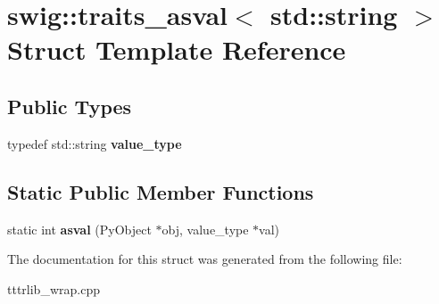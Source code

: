 \hypertarget{structswig_1_1traits__asval_3_01std_1_1string_01_4}{}\section{swig\+:\+:traits\+\_\+asval$<$ std\+:\+:string $>$ Struct Template Reference}
\label{structswig_1_1traits__asval_3_01std_1_1string_01_4}
\subsection*{Public Types}
\begin{DoxyCompactItemize}
\item 
\mbox{\label{structswig_1_1traits__asval_3_01std_1_1string_01_4_a66eab9ad087e2527eb509f04e6e70d75}} 
typedef std\+::string {\bfseries value\+\_\+type}
\end{DoxyCompactItemize}
\subsection*{Static Public Member Functions}
\begin{DoxyCompactItemize}
\item 
\mbox{\label{structswig_1_1traits__asval_3_01std_1_1string_01_4_a1b4d91079cc3870021fac8f5514404ff}} 
static int {\bfseries asval} (Py\+Object $\ast$obj, value\+\_\+type $\ast$val)
\end{DoxyCompactItemize}


The documentation for this struct was generated from the following file\+:\begin{DoxyCompactItemize}
\item 
tttrlib\+\_\+wrap.\+cpp\end{DoxyCompactItemize}
